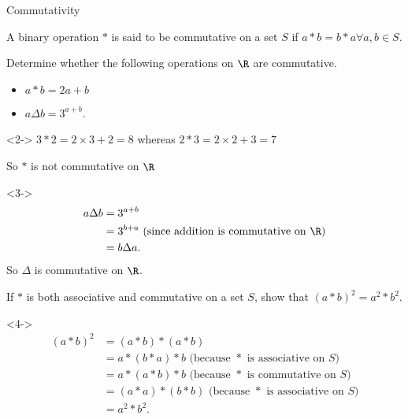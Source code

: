 \documentclass[8pt]{beamer}
\begin{document}
\begin{frame}[shrink]{Commutativity}
	\begin{definition}
		A binary operation $*$ is said to be commutative on a set  $S$ if  $a*b=b*a \forall a,b \in S$.
	\end{definition}
	\begin{problem}
		Determine whether the following operations on $\R$ are commutative.
		\begin{itemize}
			\item $a*b=2a+b$
			\item  $a\Delta b = 3^{a+b}$.
		\end{itemize}
	\end{problem}
	\begin{solution}<2->
		$3*2=2\times 3 +2 =8$ whereas $2*3= 2\times 2+3=7$

		So $*$ is not commutative on  $\R$
	\end{solution}
	\begin{solution}<3->
		\begin{align*}
			a\Delta b &= 3^{a+b} \\
				  &= 3^{b+a} \text{ (since addition is commutative on $ \R$)} \\
				  &= b\Delta a 
		.\end{align*}
So $\Delta$ is commutative on  $\R$.

	\end{solution}

	\begin{problem}
		If $*$ is both associative and commutative on a set  $S$, show that  $(a*b)^2=a^2*b^2.$
	\end{problem}

	\begin{solution}<4->
		\begin{align*}
			(a*b)^2&=(a*b)*(a*b)\\
			       &= a*(b*a)*b \text{ (because $*$ is associative on  $S$)} \\
			       &= a*(a*b)*b \text{ (because $*$ is commutative on  $S$)} \\
			       &= (a*a)*(b*b) \text{ (because $*$ is associative on  $S$)} \\
			       &= a^2*b^2  
		.\end{align*}
		
	\end{solution}
\end{frame}
\end{document}
